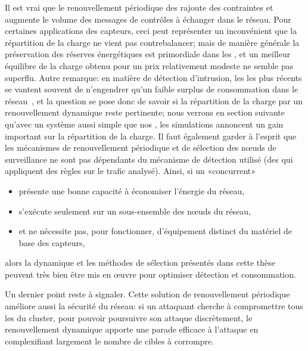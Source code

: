 Il est vrai que le renouvellement périodique des \cns rajoute des contraintes et augmente le volume des messages de contrôles à échanger dans le réseau.
Pour certaines applications des capteurs, ceci peut représenter un inconvénient que la répartition de la charge ne vient pas contrebalancer; mais de manière générale la préservation des réserves énergétiques est primordiale dans les \rcs, et un meilleur équilibre de la charge obtenu pour un prix relativement modeste ne semble pas superflu.
Autre remarque: en matière de détection d'intrusion, les \IDS les plus récents se vantent souvent de n'engendrer qu'un faible surplus de consommation dans le réseau~\cite{LZYP08}, et la question se pose donc de savoir si la répartition de la charge par un renouvellement dynamique reste pertinente; nous verrons en section suivante qu'avec un système aussi simple que nos \cns, les simulations annoncent un gain important sur la répartition de la charge.
Il faut également garder à l'esprit que les mécanismes de renouvellement périodique et de sélection des nœuds de surveillance ne sont pas dépendants du mécanisme de détection utilisé (\cad des \cns qui appliquent des règles sur le trafic analysé).
Ainsi, si un \IDS «concurrent»
\begin{itemize}
    \item présente une bonne capacité à économiser l'énergie du réseau,
    \item s'exécute seulement sur un sous-ensemble des nœuds du réseau,
    \item et ne nécessite pas, pour fonctionner, d'équipement distinct du matériel de base des capteurs,
\end{itemize}
alors la dynamique et les méthodes de sélection présentés dans cette thèse peuvent très bien être mis en œuvre pour optimiser détection et consommation.

Un dernier point reste à signaler.
Cette solution de renouvellement périodique améliore aussi la sécurité du réseau: si un attaquant cherche à compromettre tous les \cns du cluster, pour pouvoir poursuivre son attaque discrètement, le renouvellement dynamique apporte une parade efficace à l'attaque en complexifiant largement le nombre de cibles à corrompre.

